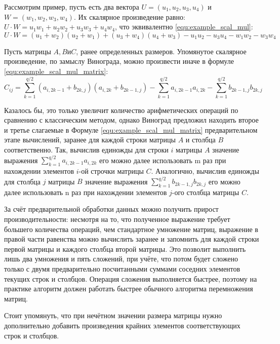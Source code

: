 Рассмотрим пример, пусть есть два вектора $U = (u_1, u_2, u_3, u_4)$ и $W = (w_1, w_2, w_3, w_4)$. Их скалярное произведение равно: $U \cdot W = u_1w_1 + u_2w_2 + u_3w_3 + u_4w_4$, что
эквивалентно \ref{equ:example_scal_mul}:
\begin{equation} 
	\label{equ:example_scal_mul}
	U \cdot W = (u_1 + w_2)(u_2 + w_1) + (u_3 + w_4)(u_4 + w_3) - u_1u_2 - u_3u_4 - w_1w_2 - w_3w_4
\end{equation}

Пусть матрицы $A, B и C$, ранее определенных размеров. Упомянутое скалярное произведение, по замыслу Винограда, можно произвести иначе в формуле \ref{equ:example_scal_mul_matrix}:
\begin{equation} 
	\label{equ:example_scal_mul_matrix}
	C_{ij} = \sum_{k=1}^{q/2}(a_{i,2k-1} + b_{2k,j})(a_{i,2k} + b_{2k-1,j}) - \sum_{k=1}^{q/2} a_{i,2k-1}a_{i,2k} - \sum_{k=1}^{q/2} b_{2k-1,j}b_{2k,j}
\end{equation}

Казалось бы, это только увеличит количество арифметических операций по сравнению с классическим методом, однако Виноград предложил находить второе и третье слагаемые в Формуле \ref{equ:example_scal_mul_matrix} предварительном этапе вычислений, заранее для каждой строки матрицы $A$ и столбца $B$ соответственно. Так, вычислив единожды для строки $i$ матрицы $A$ значение выражения $\sum_{k=1}^{q/2}a_{i,2k-1}a_{i,2k}$ его можно далее использовать m раз при нахождении элементов $i$-ой строчки матрицы $C$. Аналогично, вычислив единожды для
столбца $j$ матрицы $B$ значение выражения $\sum_{k=1}^{q/2} b_{2k-1,j}b_{2k,j}$ его можно
далее использовать n раз при нахождении элементов $j$-ого столбца матрицы $C$. \cite{book_vinograd}

За счёт предварительной обработки данных можно получить прирост производительности: несмотря на то, что полученное выражение требует большего количества операций, чем стандартное умножение матриц, выражение в правой части равенства можно вычислить заранее и запомнить для каждой строки первой матрицы и каждого столбца второй матрицы. Это позволит выполнить лишь два умножения и пять сложений, при учёте, что потом будет сложено только с двумя предварительно посчитанными суммами соседних элементов текущих строк и столбцов. Операция сложения выполняется
быстрее, поэтому на практике алгоритм должен работать быстрее обычного алгоритма перемножения матриц.

Стоит упомянуть, что при нечётном значении размера матрицы нужно дополнительно добавить произведения крайних элементов соответствующих строк и столбцов.


